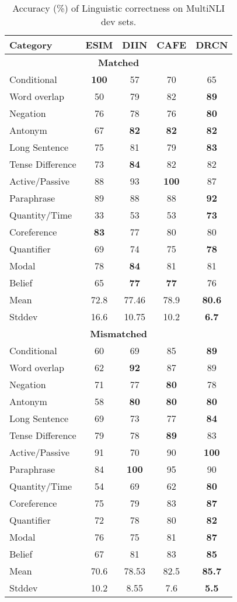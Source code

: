 \documentclass[letterpaper]{article} \usepackage{aaai19}  \usepackage{times}  \usepackage{helvet}  \usepackage{courier}  \usepackage{url}  \usepackage{graphicx}  \frenchspacing  \setlength{\pdfpagewidth}{8.5in}  \setlength{\pdfpageheight}{11in}
\begin{document}
\begin{table}[t!]
\centering
\scalebox{0.823}
{
\begin{tabular}{lcccc}\hline
\textbf{Category} & \textbf{ESIM} & \textbf{DIIN} & \textbf{CAFE} & \textbf{DRCN}  \\
	\hline
	  \multicolumn{5}{c}{\textbf{Matched}} \\
	\hline
    Conditional	& \textbf{100}	&57&70&	65 \\
    Word overlap	& 50	&79&82	&\textbf{89} \\
    Negation	& 76	&78&76	&\textbf{80}	 \\
    Antonym& 67	&\textbf{82}&\textbf{82}&\textbf{82}  \\
    Long Sentence & 75	&81&79	&\textbf{83} \\
    Tense Difference & 73	&\textbf{84}&82&82 \\
    Active/Passive	& 88	&93&\textbf{100}	&87  \\
    Paraphrase	& 89	&88&88&	\textbf{92}  \\
    Quantity/Time & 33	&53&53	&\textbf{73} \\
    Coreference	& \textbf{83}	&77&80	&80	 \\
    Quantifier	& 69	&74&75	&\textbf{78}  \\
    Modal	& 78&\textbf{84}&81&81 \\
    Belief	& 65	&\textbf{77}& \textbf{77}&	76 \\
    \hline
    Mean	&72.8	&77.46&78.9	&\textbf{80.6}  \\
	Stddev	&16.6	&10.75&10.2	&\textbf{6.7} \\
	\hline
	\hline
    \multicolumn{5}{c}{\textbf{Mismatched}}  \\
	\hline
    Conditional	&	60&69	&85&	\textbf{89} \\
    Word overlap &62&\textbf{92}&	87	&89 \\
    Negation	&71	&77&\textbf{80}	&78 \\
    Antonym	 &58&\textbf{80}&\textbf{80}&\textbf{80} \\
    Long Sentence	&	69&73&	77	&\textbf{84} \\
    Tense Difference&79	&78&\textbf{89}&	83 \\
    Active/Passive&	91&70&	90	&\textbf{100} \\
    Paraphrase	&84	&\textbf{100}&95&90 \\
    Quantity/Time &54&69	&62	&\textbf{80} \\
    Coreference &75&79&	83&	\textbf{87} \\
    Quantifier	 &72&78&	80&	\textbf{82} \\
    Modal	&	76&	75&81	&\textbf{87} \\
    Belief &	67&81	&83	&\textbf{85} \\
    \hline
    Mean	&	70.6&78.53	&82.5&	\textbf{85.7} \\
	Stddev	&	10.2&8.55&	7.6&	\textbf{5.5} \\
	\hline
    \end{tabular}
}
\caption{Accuracy (\%) of Linguistic correctness on MultiNLI dev sets.}
\label{tab:linguistic_mnli}
\end{table} 
\end{document}
